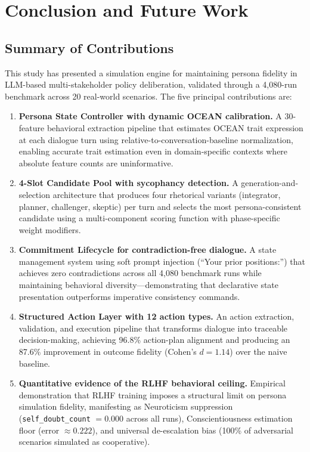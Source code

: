 \chapter{Conclusion and Future Work}

\section{Summary of Contributions}

This study has presented a simulation engine for maintaining persona fidelity in LLM-based multi-stakeholder policy deliberation, validated through a 4,080-run benchmark across 20 real-world scenarios. The five principal contributions are:

\begin{enumerate}[leftmargin=*, itemsep=3pt]
    \item \textbf{Persona State Controller with dynamic OCEAN calibration.} A 30-feature behavioral extraction pipeline that estimates OCEAN trait expression at each dialogue turn using relative-to-conversation-baseline normalization, enabling accurate trait estimation even in domain-specific contexts where absolute feature counts are uninformative.

    \item \textbf{4-Slot Candidate Pool with sycophancy detection.} A generation-and-selection architecture that produces four rhetorical variants (integrator, planner, challenger, skeptic) per turn and selects the most persona-consistent candidate using a multi-component scoring function with phase-specific weight modifiers.

    \item \textbf{Commitment Lifecycle for contradiction-free dialogue.} A state management system using soft prompt injection (``Your prior positions:'') that achieves zero contradictions across all 4,080 benchmark runs while maintaining behavioral diversity---demonstrating that declarative state presentation outperforms imperative consistency commands.

    \item \textbf{Structured Action Layer with 12 action types.} An action extraction, validation, and execution pipeline that transforms dialogue into traceable decision-making, achieving 96.8\% action-plan alignment and producing an 87.6\% improvement in outcome fidelity (Cohen's $d = 1.14$) over the naive baseline.

    \item \textbf{Quantitative evidence of the RLHF behavioral ceiling.} Empirical demonstration that RLHF training imposes a structural limit on persona simulation fidelity, manifesting as Neuroticism suppression (\texttt{self\_doubt\_count} $= 0.000$ across all runs), Conscientiousness estimation floor (error $\approx 0.222$), and universal de-escalation bias (100\% of adversarial scenarios simulated as cooperative).
\end{enumerate}


